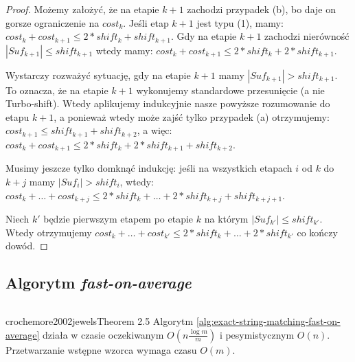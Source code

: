 \begin{proof}
	Możemy założyć, że na etapie $k+1$ zachodzi przypadek (b), bo daje on gorsze ograniczenie na $cost_k$. Jeśli etap $k+1$ jest typu (1), mamy: $cost_k + cost_{k+1} \leq 2 * shift_k + shift_{k+1}$. Gdy na etapie $k+1$ zachodzi nierówność $|Suf_{k+1}| \leq shift_{k+1}$ wtedy mamy: $cost_k + cost_{k+1} \leq 2 * shift_k + 2* shift_{k+1}$.

	Wystarczy rozważyć sytuację, gdy na etapie $k+1$ mamy $|Suf_{k+1}| > shift_{k+1}$. To oznacza, że na etapie $k+1$ wykonujemy standardowe przesunięcie (a nie Turbo-shift). Wtedy aplikujemy indukcyjnie nasze powyższe rozumowanie do etapu $k+1$, a ponieważ wtedy może zajść tylko przypadek (a) otrzymujemy: $cost_{k+1} \leq shift_{k+1} + shift_{k+2}$, a więc: $cost_k + cost_{k+1} \leq 2 * shift_k + 2*shift_{k+1} + shift_{k+2}$.

	Musimy jeszcze tylko domknąć indukcję: jeśli na wszystkich etapach $i$ od $k$ do $k+j$ mamy $|Suf_i| > shift_i$, wtedy: $cost_k + \ldots + cost_{k+j} \leq 2*shift_k + \ldots + 2*shift_{k+j} + shift_{k+j+1}$.

	Niech $k'$ będzie pierwszym etapem po etapie $k$ na którym $|Suf_{k'}| \leq shift_{k'}$. Wtedy otrzymujemy $cost_k + \ldots + cost_{k'} \leq 2*shift_k + \ldots + 2*shift_{k'}$ co kończy dowód.
\end{proof}


\subsection{Algorytm \emph{fast-on-average}}

\begin{code}
\inputminted{python}{code/exact-string-matching/fast-on-average.py}
\label{alg:exact-string-matching-fast-on-average}
\end{code}

\begin{theorem}{crochemore2002jewels}{Theorem 2.5}
  Algorytm \ref{alg:exact-string-matching-fast-on-average} działa w czasie oczekiwanym $O\left(n \frac{\log{m}}{m}\right)$ i pesymistycznym $O(n)$. Przetwarzanie wstępne wzorca wymaga czasu $O(m)$.
\end{theorem}

